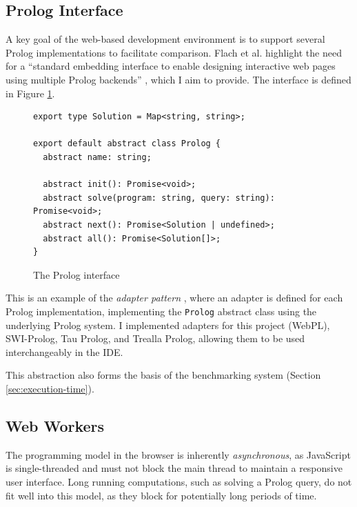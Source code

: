 \subsection{Prolog Interface}

\label{sec:prolog-interface}

A key goal of the web-based development environment is to support several Prolog implementations to facilitate comparison. Flach et al. highlight the need for a ``standard embedding interface to enable designing interactive web pages using multiple Prolog backends'' \cite{flachSimplyLogicalFirst2023}, which I aim to provide. The interface is defined in Figure \ref{fig:prolog-interface}.

\begin{figure}[H]
\centering
\begin{verbatim}
export type Solution = Map<string, string>;

export default abstract class Prolog {
  abstract name: string;

  abstract init(): Promise<void>;
  abstract solve(program: string, query: string): Promise<void>;
  abstract next(): Promise<Solution | undefined>;
  abstract all(): Promise<Solution[]>;
}
\end{verbatim}
\caption{The Prolog interface}
\label{fig:prolog-interface}
\end{figure}

This is an example of the \emph{adapter pattern} \cite{gammaDesignPatternsElements1995}, where an adapter is defined for each Prolog implementation, implementing the \texttt{Prolog} abstract class using the underlying Prolog system. I implemented adapters for this project (WebPL), SWI-Prolog, Tau Prolog, and Trealla Prolog, allowing them to be used interchangeably in the IDE.

This abstraction also forms the basis of the benchmarking system (Section \ref{sec:execution-time}).

\subsection{Web Workers}

The programming model in the browser is inherently \emph{asynchronous}, as JavaScript is single-threaded and must not block the main thread to maintain a responsive user interface. Long running computations, such as solving a Prolog query, do not fit well into this model, as they block for potentially long periods of time.

